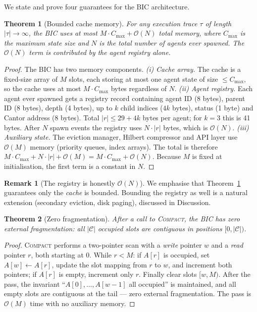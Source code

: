 \documentclass[fleqn,10pt]{article}
\newtheorem{theorem}{Theorem}
\theoremstyle{definition}
\newtheorem{remark}{Remark}
\newcommand{\BIC}{\mathcal{C}}
\newcommand{\Oh}{\mathcal{O}}
\newcommand{\slots}{M}
\begin{document}
We state and prove four guarantees for the BIC architecture.

\begin{theorem}[Bounded cache memory]
\label{thm:bounded}
For any execution trace $\tau$ of length $|\tau| \to \infty$, the
BIC uses at most $\slots \cdot C_{\max} + \Oh(N)$ total memory,
where $C_{\max}$ is the maximum state size and $N$ is the total
number of agents ever spawned. The $\Oh(N)$ term is contributed by
the agent registry alone.
\end{theorem}

\begin{proof}
The BIC has two memory components.
\emph{(i) Cache array.} The cache is a fixed-size array of $\slots$
slots, each storing at most one agent state of size $\leq C_{\max}$,
so the cache uses at most $\slots \cdot C_{\max}$ bytes regardless
of $N$.
\emph{(ii) Agent registry.} Each agent ever spawned gets a registry
record containing agent ID (8 bytes), parent ID (8 bytes), depth
(4 bytes), up to $k$ child indices ($4k$ bytes), status (1 byte) and
Cantor address (8 bytes). Total $|r| \leq 29 + 4k$ bytes per agent;
for $k{=}3$ this is 41 bytes. After $N$ spawn events the registry
uses $N \cdot |r|$ bytes, which is $\Oh(N)$.
\emph{(iii) Auxiliary state.} The eviction manager, Hilbert
compressor and API layer use $\Oh(\slots)$ memory (priority queues,
index arrays). The total is therefore
$\slots \cdot C_{\max} + N \cdot |r| + \Oh(\slots) =
\slots \cdot C_{\max} + \Oh(N)$. Because $\slots$ is fixed at
initialisation, the first term is a constant in $N$.
\end{proof}

\begin{remark}[The registry is honestly $\Oh(N)$]
We emphasise that Theorem~\ref{thm:bounded} guarantees only the
\emph{cache} is bounded. Bounding the registry as well is a natural
extension (secondary eviction, disk paging), discussed in
Discussion.
\end{remark}

\begin{theorem}[Zero fragmentation]
\label{thm:frag}
After a call to \textsc{Compact}, the BIC has zero external
fragmentation: all $|\BIC|$ occupied slots are contiguous in
positions $[0, |\BIC|)$.
\end{theorem}

\begin{proof}
\textsc{Compact} performs a two-pointer scan with a \emph{write}
pointer $w$ and a \emph{read} pointer $r$, both starting at 0. While
$r < \slots$: if $A[r]$ is occupied, set $A[w] \gets A[r]$, update
the slot mapping from $r$ to $w$, and increment both pointers; if
$A[r]$ is empty, increment only $r$. Finally clear slots
$[w, \slots)$. After the pass, the invariant
``$A[0], \ldots, A[w-1]$ all occupied'' is maintained, and all empty
slots are contiguous at the tail --- zero external fragmentation.
The pass is $\Oh(\slots)$ time with no auxiliary memory.
\end{proof}
\end{document}

